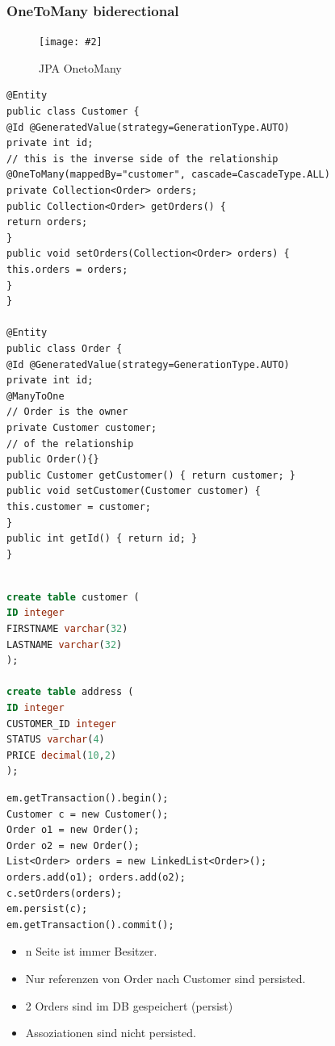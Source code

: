 \documentclass[a4paper,10pt]{scrreprt}
\newcommand{\pic}[2][figure]{\begin{figure}[h]
 \centering
 \texttt{[image: \#2]}
 \caption{#1}
\end{figure}
}
\begin{document}
\subsubsection{OneToMany biderectional}
\pic[JPA OnetoMany]{jpa1n.png}
\begin{lstlisting}[caption=JPA 1 to n]
 @Entity
public class Customer {
@Id @GeneratedValue(strategy=GenerationType.AUTO)
private int id;
// this is the inverse side of the relationship
@OneToMany(mappedBy="customer", cascade=CascadeType.ALL)
private Collection<Order> orders;
public Collection<Order> getOrders() {
return orders;
}
public void setOrders(Collection<Order> orders) {
this.orders = orders;
}
}

@Entity
public class Order {
@Id @GeneratedValue(strategy=GenerationType.AUTO)
private int id;
@ManyToOne
// Order is the owner
private Customer customer;
// of the relationship
public Order(){}
public Customer getCustomer() { return customer; }
public void setCustomer(Customer customer) {
this.customer = customer;
}
public int getId() { return id; }
}

\end{lstlisting}

\begin{lstlisting}[language=sql,caption=JPA 1 to n sql]

create table customer (
ID integer
FIRSTNAME varchar(32)
LASTNAME varchar(32)
);

create table address (
ID integer
CUSTOMER_ID integer
STATUS varchar(4)
PRICE decimal(10,2)
);
\end{lstlisting}

\begin{lstlisting}[caption=OneToMany Bidirectional persist JPA]
 em.getTransaction().begin();
Customer c = new Customer();
Order o1 = new Order();
Order o2 = new Order();
List<Order> orders = new LinkedList<Order>();
orders.add(o1); orders.add(o2);
c.setOrders(orders);
em.persist(c);
em.getTransaction().commit();
\end{lstlisting}

\begin{framed}
 \begin{itemize}
  \item n Seite ist immer Besitzer.
  \item Nur referenzen von Order nach Customer sind persisted.
  \item 2 Orders sind im DB gespeichert (persist)
  \item Assoziationen sind nicht persisted.
 \end{itemize}

\end{framed}
\end{document}
